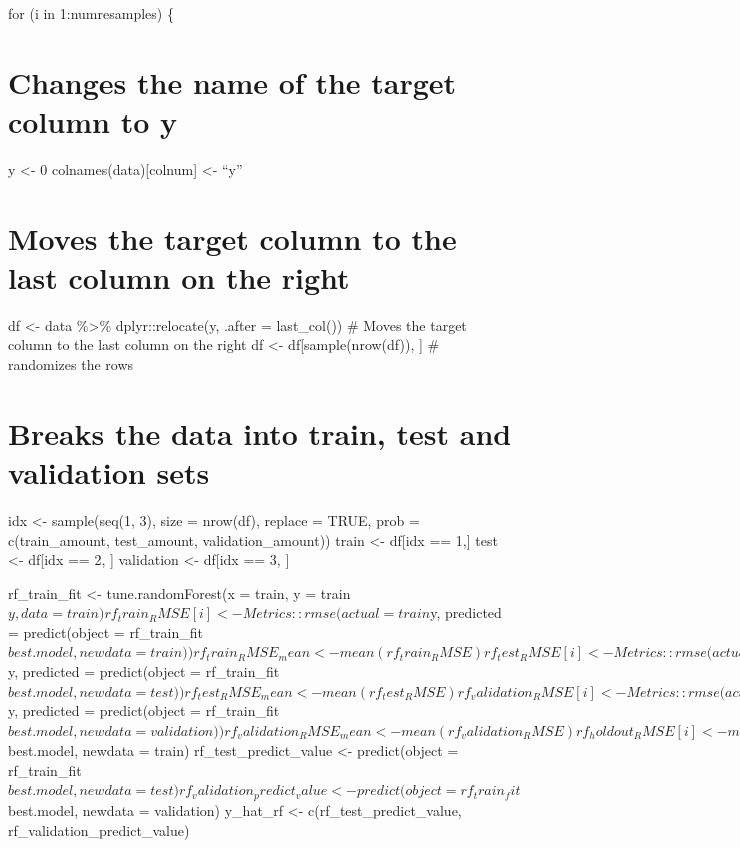 \documentclass[
]{book}
\begin{document}
for (i in 1:numresamples) \{

\chapter{Changes the name of the target column to y}\label{changes-the-name-of-the-target-column-to-y-12}

y \textless- 0 colnames(data){[}colnum{]} \textless- ``y''

\chapter{Moves the target column to the last column on the right}\label{moves-the-target-column-to-the-last-column-on-the-right-12}

df \textless- data \%\textgreater\% dplyr::relocate(y, .after = last\_col()) \# Moves the
target column to the last column on the right df \textless-
df{[}sample(nrow(df)), {]} \# randomizes the rows

\chapter{Breaks the data into train, test and validation sets}\label{breaks-the-data-into-train-test-and-validation-sets-12}

idx \textless- sample(seq(1, 3), size = nrow(df), replace = TRUE, prob =
c(train\_amount, test\_amount, validation\_amount)) train \textless- df{[}idx == 1,{]} test \textless- df{[}idx == 2, {]} validation \textless- df{[}idx == 3, {]}

rf\_train\_fit \textless- tune.randomForest(x = train, y = train\(y, data = train)
rf_train_RMSE[i] <- Metrics::rmse(actual = train\)y, predicted =
predict(object = rf\_train\_fit\(best.model, newdata = train))
rf_train_RMSE_mean <- mean(rf_train_RMSE)
rf_test_RMSE[i] <- Metrics::rmse(actual = test\)y, predicted =
predict(object = rf\_train\_fit\(best.model, newdata = test))
rf_test_RMSE_mean <- mean(rf_test_RMSE)
rf_validation_RMSE[i] <- Metrics::rmse(actual = validation\)y, predicted
= predict(object = rf\_train\_fit\(best.model, newdata = validation))
rf_validation_RMSE_mean <- mean(rf_validation_RMSE)
rf_holdout_RMSE[i] <- mean(c(rf_test_RMSE_mean, rf_validation_RMSE_mean))
rf_holdout_RMSE_mean <- mean(rf_holdout_RMSE)
rf_holdout_RMSE_sd_mean <- sd(c(rf_test_RMSE_mean, rf_validation_RMSE_mean))
rf_train_predict_value <- predict(object = rf_train_fit\)best.model,
newdata = train) rf\_test\_predict\_value \textless- predict(object =
rf\_train\_fit\(best.model, newdata = test)
rf_validation_predict_value <- predict(object = rf_train_fit\)best.model,
newdata = validation) y\_hat\_rf \textless- c(rf\_test\_predict\_value,
rf\_validation\_predict\_value)
\end{document}
